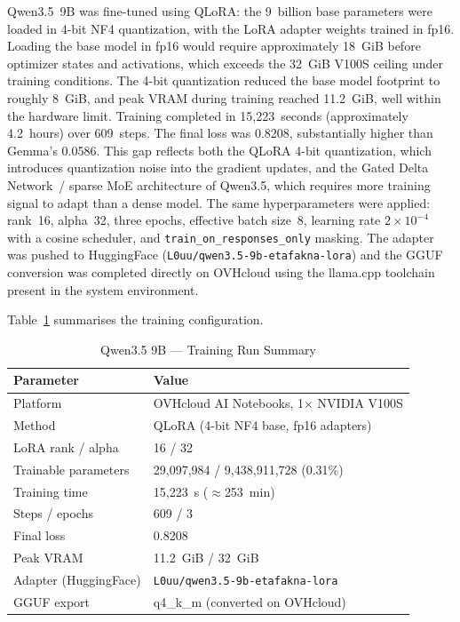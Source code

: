 Qwen3.5~9B was fine-tuned using QLoRA: the 9~billion base parameters were loaded in 4-bit NF4 quantization, with the LoRA adapter weights trained in fp16. Loading the base model in fp16 would require approximately 18~GiB before optimizer states and activations, which exceeds the 32~GiB V100S ceiling under training conditions. The 4-bit quantization reduced the base model footprint to roughly 8~GiB, and peak VRAM during training reached 11.2~GiB, well within the hardware limit. Training completed in 15,223~seconds (approximately 4.2~hours) over 609~steps. The final loss was 0.8208, substantially higher than Gemma's 0.0586. This gap reflects both the QLoRA 4-bit quantization, which introduces quantization noise into the gradient updates, and the Gated Delta Network~/ sparse MoE architecture of Qwen3.5, which requires more training signal to adapt than a dense model. The same hyperparameters were applied: rank~16, alpha~32, three epochs, effective batch size~8, learning rate $2 \times 10^{-4}$ with a cosine scheduler, and \texttt{train\_on\_responses\_only} masking. The adapter was pushed to HuggingFace (\texttt{L0uu/qwen3.5-9b-etafakna-lora}) and the GGUF conversion was completed directly on OVHcloud using the llama.cpp toolchain present in the system environment.


Table~\ref{tab:qwen-training} summarises the training configuration.

\begin{table}[H]
\centering
\caption{Qwen3.5 9B --- Training Run Summary}
\label{tab:qwen-training}
\renewcommand{\arraystretch}{1.3}
\begin{tabular}{|p{5.5cm}|p{7cm}|}
\hline
\textbf{Parameter} & \textbf{Value} \\
\hline
Platform & OVHcloud AI Notebooks, 1$\times$ NVIDIA V100S \\
\hline
Method & QLoRA (4-bit NF4 base, fp16 adapters) \\
\hline
LoRA rank / alpha & 16 / 32 \\
\hline
Trainable parameters & 29,097,984 / 9,438,911,728 (0.31\%) \\
\hline
Training time & 15,223~s ($\approx$253~min) \\
\hline
Steps / epochs & 609 / 3 \\
\hline
Final loss & 0.8208 \\
\hline
Peak VRAM & 11.2~GiB / 32~GiB \\
\hline
Adapter (HuggingFace) & \texttt{L0uu/qwen3.5-9b-etafakna-lora} \\
\hline
GGUF export & q4\_k\_m (converted on OVHcloud) \\
\hline
\end{tabular}
\end{table}

